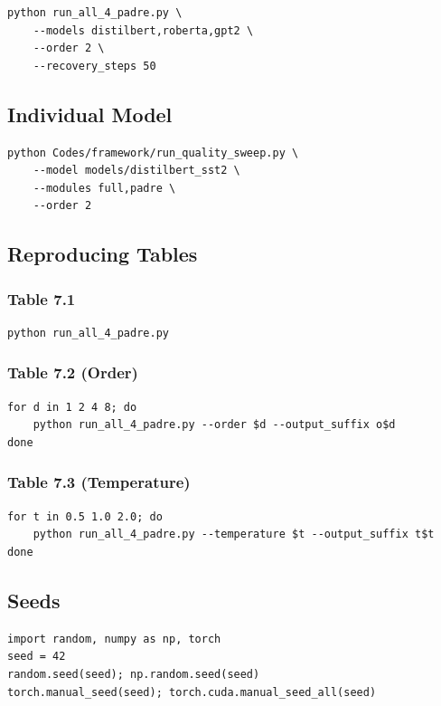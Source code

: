 \begin{lstlisting}
python run_all_4_padre.py \
    --models distilbert,roberta,gpt2 \
    --order 2 \
    --recovery_steps 50
\end{lstlisting}

\subsection{Individual Model}

\begin{lstlisting}
python Codes/framework/run_quality_sweep.py \
    --model models/distilbert_sst2 \
    --modules full,padre \
    --order 2
\end{lstlisting}

\subsection{Reproducing Tables}

\subsubsection{Table 7.1}
\begin{lstlisting}
python run_all_4_padre.py
\end{lstlisting}

\subsubsection{Table 7.2 (Order)}
\begin{lstlisting}
for d in 1 2 4 8; do
    python run_all_4_padre.py --order $d --output_suffix o$d
done
\end{lstlisting}

\subsubsection{Table 7.3 (Temperature)}
\begin{lstlisting}
for t in 0.5 1.0 2.0; do
    python run_all_4_padre.py --temperature $t --output_suffix t$t
done
\end{lstlisting}

\subsection{Seeds}

\begin{lstlisting}
import random, numpy as np, torch
seed = 42
random.seed(seed); np.random.seed(seed)
torch.manual_seed(seed); torch.cuda.manual_seed_all(seed)
\end{lstlisting}

